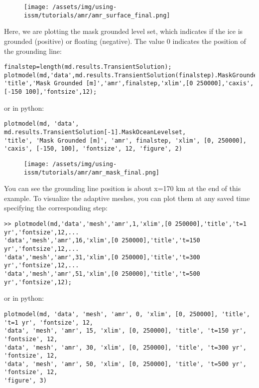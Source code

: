 \begin{figure}[H]
	\begin{center}
		\texttt{[image: /assets/img/using-issm/tutorials/amr/amr\_surface\_final.png]}
	\end{center}
\end{figure}

Here, we are plotting the mask grounded level set, which indicates if the ice is grounded (positive) or floating (negative). The value 0 indicates the position of the grounding line:
\begin{verbatim}finalstep=length(md.results.TransientSolution);
plotmodel(md,'data',md.results.TransientSolution(finalstep).MaskGroundediceLevelset,...
'title','Mask Grounded [m]','amr',finalstep,'xlim',[0 250000],'caxis',[-150 100],'fontsize',12);\end{verbatim}
or in python:
\begin{verbatim}plotmodel(md, 'data', md.results.TransientSolution[-1].MaskOceanLevelset,
'title', 'Mask Grounded [m]', 'amr', finalstep, 'xlim', [0, 250000], 'caxis', [-150, 100], 'fontsize', 12, 'figure', 2)\end{verbatim}

\begin{figure}[H]
	\begin{center}
		\texttt{[image: /assets/img/using-issm/tutorials/amr/amr\_mask\_final.png]}
	\end{center}
\end{figure}

You can see the grounding line position is about x=170 km at the end of this example. To visualize the adaptive meshes, you can plot them at any saved time specifying the corresponding step:
\begin{verbatim}>> plotmodel(md,'data','mesh','amr',1,'xlim',[0 250000],'title','t=1 yr','fontsize',12,...
'data','mesh','amr',16,'xlim',[0 250000],'title','t=150 yr','fontsize',12,...
'data','mesh','amr',31,'xlim',[0 250000],'title','t=300 yr','fontsize',12,...
'data','mesh','amr',51,'xlim',[0 250000],'title','t=500 yr','fontsize',12);\end{verbatim}
or in python:
\begin{verbatim}plotmodel(md, 'data', 'mesh', 'amr', 0, 'xlim', [0, 250000], 'title', 't=1 yr', 'fontsize', 12,
'data', 'mesh', 'amr', 15, 'xlim', [0, 250000], 'title', 't=150 yr', 'fontsize', 12,
'data', 'mesh', 'amr', 30, 'xlim', [0, 250000], 'title', 't=300 yr', 'fontsize', 12,
'data', 'mesh', 'amr', 50, 'xlim', [0, 250000], 'title', 't=500 yr', 'fontsize', 12,
'figure', 3)\end{verbatim}

